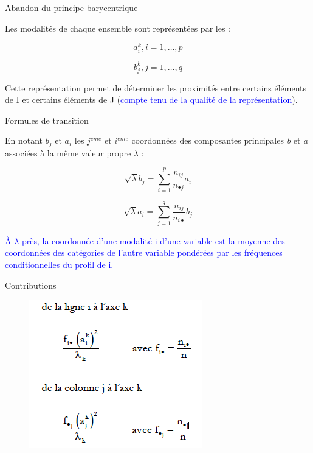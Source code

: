 \documentclass[11pt]{beamer}
\begin{document}




\begin{frame}{Abandon du principe barycentrique}

Les modalités de chaque ensemble sont représentées par les :

$$a^k_i,  i=1, \ldots, p$$

$$b^k_j ,  j=1, \ldots, q $$

Cette représentation permet de déterminer les proximités entre
certains éléments de I et certains éléments de J (\textcolor{blue}{compte tenu de la
qualité de la représentation}).

\end{frame}



\begin{frame}{Formules de transition}

En notant $b_j$ et $a_i$ les $j^{eme}$ et $i^{eme}$ coordonnées des composantes principales \textit{b} et \textit{a} associées à la même valeur propre $\lambda$ : 

$$ \sqrt{\lambda}b_j=\sum_{i=1}^p\frac{n_{ij}}{n_{\bullet j}}  a_i$$

$$ \sqrt{\lambda}a_i=\sum_{j=1}^q\frac{n_{ij}}{n_{i \bullet }}  b_j$$

\textcolor{blue}{À $\lambda$ près, la coordonnée d’une modalité i d’une variable est la moyenne des coordonnées des catégories de l’autre variable pondérées par les fréquences conditionnelles du profil de i.}
\end{frame}



\begin{frame}{Contributions}
\begin{figure}
\includegraphics[scale=0.6]{exemple16.png}  
\end{figure}
\end{frame}
\end{document}
